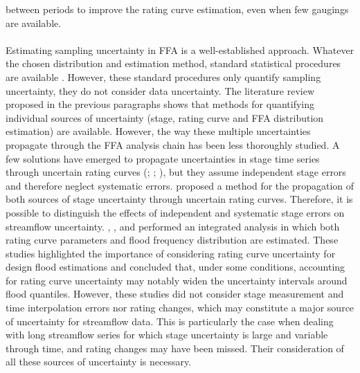 between periods to improve the rating curve estimation, even when few gaugings are available.
    
    \paragraph{}
    Estimating sampling uncertainty in FFA is a well-established approach. Whatever the chosen distribution and estimation method, standard statistical procedures are available \citep{coles_classical_2001}. However, these standard procedures only quantify sampling uncertainty, they do not consider data uncertainty. The literature review proposed in the previous paragraphs shows that methods for quantifying individual sources of uncertainty (stage, rating curve and FFA distribution estimation) are available. However, the way these multiple uncertainties propagate through the FFA analysis chain has been less thoroughly studied. A few solutions have emerged to propagate uncertainties in stage time series through uncertain rating curves (\citet{dymond_accuracy_1982}; \citet{herschy_hydrometry_1998}; \citet{petersen-overleir_uncertainty_2005}), but they assume independent stage errors and therefore neglect systematic errors. \citet{horner_impact_2018} proposed a method for the propagation of both sources of stage uncertainty through uncertain rating curves. Therefore, it is possible to distinguish the effects of independent and systematic stage errors on streamflow uncertainty. \citet{petersen-overleir_accounting_2009}, \citet{steinbakk_propagation_2016}, and \citet{vieira_assessing_2022} performed an integrated analysis in which both rating curve parameters and flood frequency distribution are estimated. These studies highlighted the importance of considering rating curve uncertainty for design flood estimations and concluded that, under some conditions, accounting for rating curve uncertainty may notably widen the uncertainty intervals around flood quantiles. However, these studies did not consider stage measurement and time interpolation errors nor rating changes, which may constitute a major source of uncertainty for streamflow data. This is particularly the case when dealing with long streamflow series for which stage uncertainty is large and variable through time, and rating changes may have been missed. Their consideration of all these sources of uncertainty is necessary.
        
